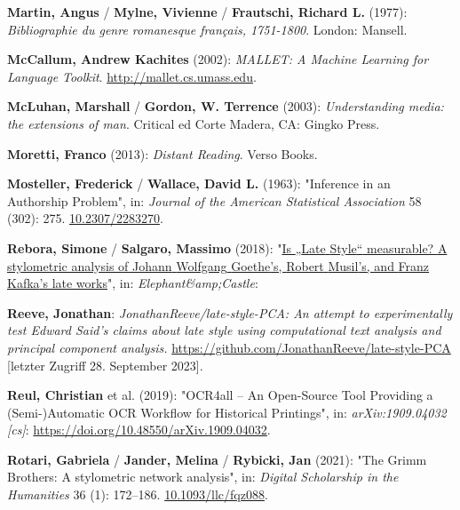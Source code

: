 \documentclass[
  12pt,
  letterpaper,
  DIV=11,
  numbers=noendperiod]{scrreprt}
\newlength{\cslhangindent}
\newenvironment{CSLReferences}[2] %
 {\begin{list}{}{%
  \setlength{\itemindent}{0pt}
  \setlength{\leftmargin}{0pt}
  \setlength{\parsep}{0pt}
  \ifodd #1
   \setlength{\leftmargin}{\cslhangindent}
   \setlength{\itemindent}{-1\cslhangindent}
  \fi
  \setlength{\itemsep}{#2\baselineskip}}}
 {\end{list}}
\begin{document}
\begin{CSLReferences}{1}{0}
\textbf{Martin, Angus} / \textbf{Mylne, Vivienne} / \textbf{Frautschi,
Richard L.} (1977): \emph{Bibliographie du genre romanesque français,
1751-1800}. London: Mansell.

\textbf{McCallum, Andrew Kachites} (2002): \emph{{MALLET}: {A} {Machine}
{Learning} for {Language} {Toolkit}}. \url{http://mallet.cs.umass.edu}.

\textbf{McLuhan, Marshall} / \textbf{Gordon, W. Terrence} (2003):
\emph{Understanding media: the extensions of man}. Critical ed Corte
Madera, CA: Gingko Press.

\textbf{Moretti, Franco} (2013): \emph{Distant {Reading}}. Verso Books.

\textbf{Mosteller, Frederick} / \textbf{Wallace, David L.} (1963):
"Inference in an {Authorship} {Problem}", in: \emph{Journal of the
American Statistical Association} 58 (302): 275.
\href{https://doi.org/10.2307/2283270}{10.2307/2283270}.

\textbf{Rebora, Simone} / \textbf{Salgaro, Massimo} (2018):
"\href{https://www.academia.edu/37943274/Is_Late_Style_measurable_A_stylometric_analysis_of_Johann_Wolfgang_Goethe_s_Robert_Musil_s_and_Franz_Kafka_s_late_works}{Is
{„{Late} {Style}``} measurable? {A} stylometric analysis of {Johann}
{Wolfgang} {Goethe}'s, {Robert} {Musil}'s, and {Franz} {Kafka}'s late
works}", in: \emph{Elephant\&amp;Castle}:

\textbf{Reeve, Jonathan}: \emph{{JonathanReeve}/late-style-{PCA}: {An}
attempt to experimentally test {Edward} {Said}'s claims about late style
using computational text analysis and principal component analysis.}
\url{https://github.com/JonathanReeve/late-style-PCA} {[}letzter Zugriff
28. September 2023{]}.

\textbf{Reul, Christian} et al. (2019): "{OCR4all} -- {An}
{Open}-{Source} {Tool} {Providing} a ({Semi}-){Automatic} {OCR}
{Workflow} for {Historical} {Printings}", in: \emph{arXiv:1909.04032
{[}cs{]}}: \url{https://doi.org/10.48550/arXiv.1909.04032}.

\textbf{Rotari, Gabriela} / \textbf{Jander, Melina} / \textbf{Rybicki,
Jan} (2021): "The {Grimm} {Brothers}: {A} stylometric network analysis",
in: \emph{Digital Scholarship in the Humanities} 36 (1): 172--186.
\href{https://doi.org/10.1093/llc/fqz088}{10.1093/llc/fqz088}.


\end{CSLReferences}
\end{document}
